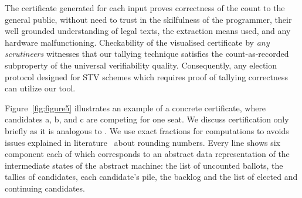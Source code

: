 \documentclass{llncs}
\begin{document}
The certificate generated for each input proves correctness of the
count to the general public, without need to trust in the skilfulness of the programmer, their  well grounded understanding of legal texts, the extraction means used, and any hardware malfunctioning. 
Checkability of the visualised certificate by \emph{any scrutineers} witnesses that our tallying technique satisfies the count-as-recorded subproperty of the universal verifiability quality. Consequently, any election protocol designed for STV schemes which requires proof of tallying correctness can utilize our tool.

 Figure~\ref{fig;figure5} illustrates an example of a concrete
 certificate, where candidates a, b, and c are competing for one
 seat. We discuss certification only briefly as it is analogous to
 \cite{Ghale:2017:FVS}.
 We use exact fractions for
 computations to avoids issues explained in
 literature~\cite{DBLP:conf/voteid/GoreL16} about rounding numbers.
 Every line shows six component each of which
 corresponds to an abstract data representation of the intermediate
 states of the abstract  machine: the 
 list of uncounted ballots, the tallies of candidates, each
 candidate's pile, the backlog and the list of elected and
 continuing candidates. 
 
\end{document}
